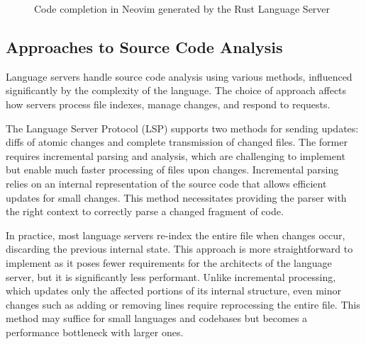 \begin{figure}[h]
    \centering
    \caption{Code completion in Neovim generated by the Rust Language Server}
    \label{fig:completion}
\end{figure}

\subsection{Approaches to Source Code Analysis}\label{subsec:ApproachesToSourceCodeAnalysis}
Language servers handle source code analysis using various methods, influenced significantly by the complexity of the language. The choice of approach affects how servers process file indexes, manage changes, and respond to requests.

The Language Server Protocol (LSP) supports two methods for sending updates: diffs of atomic changes and complete transmission of changed files. The former requires incremental parsing and analysis, which are challenging to implement but enable much faster processing of files upon changes. Incremental parsing relies on an internal representation of the source code that allows efficient updates for small changes. This method necessitates providing the parser with the right context to correctly parse a changed fragment of code.

In practice, most language servers re-index the entire file when changes occur, discarding the previous internal state. This approach is more straightforward to implement as it poses fewer requirements for the architects of the language server, but it is significantly less performant. Unlike incremental processing, which updates only the affected portions of its internal structure, even minor changes such as adding or removing lines require reprocessing the entire file. This method may suffice for small languages and codebases but becomes a performance bottleneck with larger ones.

